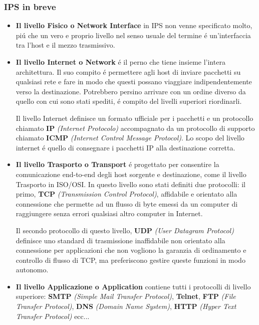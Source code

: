 \documentclass[12pt]{article}
\begin{document}
\subsubsection{IPS in breve}\label{ips-in-breve}
\begin{itemize}
	\item \textbf{Il livello Fisico o Network Interface} in IPS non venne specificato molto, pi\'u che un vero e proprio livello nel 
	senso usuale del termine \'e un'interfaccia tra l'host e il mezzo trasmissivo.
		
	\item \textbf{Il livello Internet o Network} \'e il perno che tiene insieme l'intera architettura. Il suo compito \'e permettere
	agli host di inviare pacchetti su qualsiasi rete e fare in modo che questi possano viaggiare indipendentemente verso la 
	destinazione. Potrebbero persino arrivare con un ordine diverso da quello con cui sono stati spediti, \'e compito del livelli 
	superiori riordinarli.
	
	Il livello Internet definisce un formato ufficiale per i pacchetti e un protocollo chiamato \textbf{IP} \textit{(Internet 	
	Protocolo)} accompagnato da un protocollo di supporto chiamato \textbf{ICMP} \textit{(Internet Control Message Protocol)}. Lo 	
	scopo del livello internet \'e quello di consegnare i pacchetti IP alla destinazione corretta.

	\item \textbf{Il livello Trasporto o Transport} \'e progettato per consentire la comunicazione end-to-end degli host sorgente e 
	destinazione, come il livello Trasporto in ISO/OSI. In questo livello sono stati definiti due protocolli: il primo, \textbf{TCP} 
	\textit{(Transmission Control Protocol)}, affidabile e orientato alla connessione che permette ad un flusso di byte emessi da un 
	computer di raggiungere senza errori qualsiasi altro computer in Internet.
	
	Il secondo protocollo di questo livello, \textbf{UDP} \textit{(User Datagram Protocol)} definisce uno standard di trasmissione 
	inaffidabile non orientato alla connessione per applicazioni che non vogliono la garanzia di ordinamento e controllo di flusso 
	di TCP, ma preferiscono gestire queste funzioni in modo autonomo.

	\item \textbf{Il livello Applicazione o Application} contiene tutti i protocolli di livello superiore: \textbf{SMTP} 
	\textit{(Simple Mail Transfer Protocol)}, \textbf{Telnet}, \textbf{FTP} \textit{(File Transfer Protocol)}, \textbf{DNS} 
	\textit{(Domain Name System)}, \textbf{HTTP} \textit{(Hyper Text Transfer Protocol)} ecc...
\end{itemize}
\end{document}
